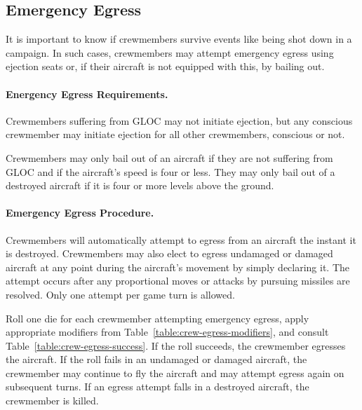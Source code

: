 \begin{advancedrules}
{}{

\section{Emergency Egress}
\label{rule:ejections-and-bail-outs}
\label{rule:emergency-egress}


It is important to know if crewmembers survive events like being shot down in a campaign. In such cases, crewmembers may attempt emergency egress using ejection seats or, if their aircraft is not equipped with this, by bailing out.

\paragraph{Energency Egress Requirements.} Crewmembers suffering from GLOC may not initiate ejection, but any conscious crewmember may initiate ejection for all other crewmembers, conscious or not.

Crewmembers may only bail out of an aircraft if they are not suffering from GLOC and if the aircraft's speed is four or less. They may only bail out of a destroyed aircraft if it is four or more levels above the ground.

\paragraph{Emergency Egress Procedure.} Crewmembers will automatically attempt to egress from an aircraft the instant it is destroyed. Crewmembers may also elect to egress undamaged or damaged aircraft at any point during the aircraft's movement by simply declaring it. The attempt occurs after any proportional moves or attacks by pursuing missiles are resolved. Only one attempt per game turn is allowed.

Roll one die for each crewmember attempting emergency egress, apply appropriate modifiers from Table~\ref{table:crew-egress-modifiers}, and consult Table~\ref{table:crew-egress-success}. If the roll succeeds, the crewmember egresses the aircraft. If the roll fails in an undamaged or damaged aircraft, the crewmember may continue to fly the aircraft and may attempt egress again on subsequent turns. If an egress attempt falls in a destroyed aircraft, the crewmember is killed.


}
\end{advancedrules}
